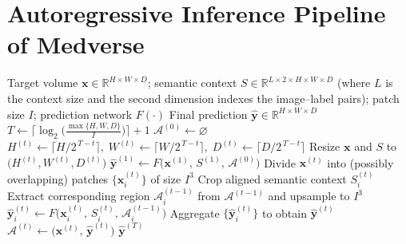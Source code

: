 \section{Autoregressive Inference Pipeline of Medverse}
\begin{algorithm}[h]
\caption{Autoregressive Inference Pipeline of Medverse}
\label{alg:medverse_inference}
\begin{algorithmic}[1]  %
\Require Target volume $\bm{x}\in\mathbb{R}^{H\times W\times D}$; 
        semantic context $S\in\mathbb{R}^{L\times 2 \times H\times W\times D}$ 
        (where $L$ is the context size and the second dimension indexes the image–label pairs); 
        patch size $I$; 
        prediction network $F(\cdot)$
\Ensure  Final prediction $\hat{\bm{y}}\in\mathbb{R}^{H\times W\times D}$
%
\State $T \gets \bigl\lceil\log_{2}\bigl(\frac{\max\{H,W,D\}}{I}\bigr)\bigr\rceil + 1$
\State $\mathcal{A}^{(0)} \gets \varnothing$ 
%
                       
    \State $H^{(t)}\!\gets\!\lceil H / 2^{\,T-t}\rceil,\;
           W^{(t)}\!\gets\!\lceil W / 2^{\,T-t}\rceil,\;
           D^{(t)}\!\gets\!\lceil D / 2^{\,T-t}\rceil$
    \State Resize $\bm{x}$ and $S$ to $\bigl(H^{(t)},W^{(t)},D^{(t)}\bigr)$
              
        \State $\hat{\bm{y}}^{(1)} \gets
               F\bigl(\bm{x}^{(1)},\, S^{(1)},\, \mathcal{A}^{(0)}\bigr)$
    \Else                   {}
        \State Divide $\bm{x}^{(t)}$ into (possibly overlapping) patches
               $\{\bm{x}^{(t)}_i\}$ of size $I^3$
            \State Crop aligned semantic context $S^{(t)}_i$
            \State Extract corresponding region
                   $\mathcal{A}^{(t-1)}_i$ from $\mathcal{A}^{(t-1)}$
                   and upsample to $I^3$
            \State $\hat{\bm{y}}^{(t)}_i \gets
                   F\bigl(\bm{x}^{(t)}_i,\,
                          S^{(t)}_i,\,
                          \mathcal{A}^{(t-1)}_i\bigr)$
        \EndFor
        \State Aggregate $\{\hat{\bm{y}}^{(t)}_i\}$
               to obtain $\hat{\bm{y}}^{(t)}$
    \EndIf
    \State $\mathcal{A}^{(t)} \gets \bigl(\bm{x}^{(t)},\, \hat{\bm{y}}^{(t)}\bigr)$
\EndFor
%
\Return $\hat{\bm{y}}^{(T)}$
\end{algorithmic}
\end{algorithm}



